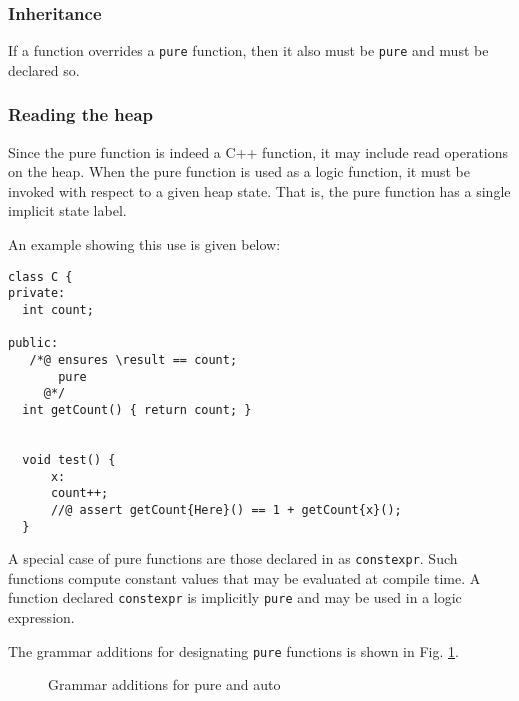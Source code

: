 \subsubsection{Inheritance}
If a function overrides a \lstinline|pure| function, then it also must be \lstinline|pure| and must be declared so.

\subsubsection*{Reading the heap}
Since the pure function is indeed a C++ function, it may include read operations on the heap. When the pure function is used as a logic function,
it must be invoked with respect to a given heap state. 
That is, the pure function has a single implicit state label.


An example showing this use is given below:
\begin{lstlisting}
class C {
private:
  int count;

public:
   /*@ ensures \result == count;
       pure
     @*/   
  int getCount() { return count; }
  
  
  void test() {
      x:
      count++;
      //@ assert getCount{Here}() == 1 + getCount{x}();
  }

\end{lstlisting}

A special case of pure functions are those declared in \lang as \lstinline|constexpr|.
Such functions compute constant values that may be evaluated at compile time. A function declared \lstinline|constexpr| is implicitly \lstinline|pure| and may be used in a logic expression.

The grammar additions for designating \lstinline|pure| functions is shown in Fig. \ref{fig:gram:pure}.


\begin{figure}
\begin{cadre}

\end{cadre}
\caption{Grammar additions for pure and auto}
\label{fig:gram:pure}
\end{figure}

